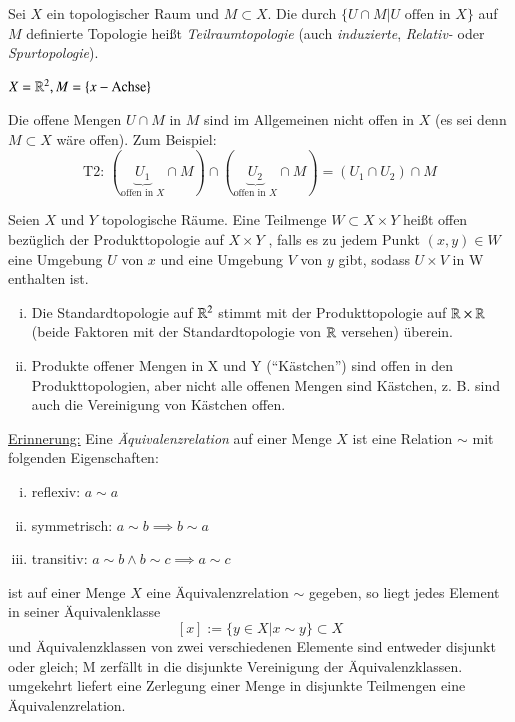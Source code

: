 \documentclass[a4paper,10pt]{scrartcl}
\begin{document}
\begin{df} Sei $ X $ ein topologischer Raum und $ M \subset X $. Die durch $ \{ U\cap M| U \text{ offen in } X \}$ auf $M$ definierte Topologie heißt \emph{Teilraumtopologie} (auch \emph{induzierte}, \emph{Relativ-} oder \emph{Spurtopologie}). 
\end{df}
\begin{ex*}
$X=\mathbb{R}^2, M=\{x-\text{Achse}\}$
\begin{figure}[ht]
\centering

\end{figure}
\end{ex*}
\begin{att*}
Die offene Mengen $U\cap M$ in $ M $ sind im Allgemeinen nicht offen in $ X $ (es sei denn $ M\subset X $ wäre offen). Zum Beispiel:
\[
\text{T2: } (\underbrace{U_1}_{\text{offen in }X}\cap M)\cap (\underbrace{U_2}_{\text{offen in }X}\cap M)=(U_1\cap U_2)\cap M
\]
\end{att*}
\begin{df}
Seien $ X $ und $ Y $ topologische Räume. Eine Teilmenge $ W\subset X\times Y $ heißt offen bezüglich der Produkttopologie auf $ X\times Y $ , falls es zu jedem Punkt $ (x,y)\in W $ eine Umgebung $ U $ von $ x $ und eine Umgebung $ V $ von $ y $ gibt, sodass $ U\times V $ in W enthalten ist.
\begin{figure}[ht]
\centering

\end{figure}
\end{df}
\begin{note*}
\begin{enumerate}[(i)]
\item Die Standardtopologie auf $ \mathbb{R}^2 $ stimmt mit der Produkttopologie auf $ \mathbb{R}\times \mathbb{R} $ (beide Faktoren mit der Standardtopologie von $ \mathbb{R} $ versehen) überein.
\item Produkte offener Mengen in X und Y ("`Kästchen"') sind offen in den Produkttopologien, aber nicht alle offenen Mengen sind Kästchen, z. B. sind auch die Vereinigung von Kästchen offen.\\
\begin{figure}[ht]
\centering

\end{figure}
\end{enumerate}
\underline{Erinnerung:} Eine \emph{Äquivalenzrelation} auf einer Menge $ X $ ist eine Relation $\sim$ mit folgenden Eigenschaften:
\begin{enumerate}[(i)]
\item reflexiv: $a\sim a$
\item symmetrisch: $a\sim b \implies b\sim a$
\item transitiv: $a\sim b \land b \sim c\implies a\sim c$
\end{enumerate}
ist auf einer Menge $ X $ eine Äquivalenzrelation $\sim$ gegeben, so liegt jedes Element in seiner Äquivalenklasse
\[
 [x]:=\{y\in X|x\sim y\} \subset X
\]
und Äquivalenzklassen von zwei verschiedenen Elemente sind entweder disjunkt oder gleich; M zerfällt in die disjunkte Vereinigung der Äquivalenzklassen.  umgekehrt liefert eine Zerlegung einer Menge in disjunkte Teilmengen eine Äquivalenzrelation.
\end{note*}
\end{document}
